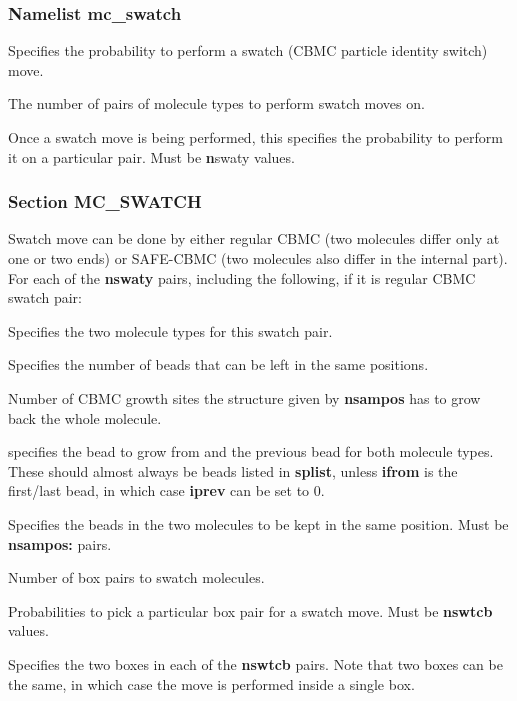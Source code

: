 \documentclass[12pt,letterpaper]{article}
\begin{document}
\subsubsection{Namelist \textbf{mc\_swatch}}
 Specifies the probability to perform
a swatch (CBMC particle identity switch) move.

 The number of pairs of molecule types
to perform swatch moves on.

 Once a swatch move is being
performed, this specifies the probability to perform it on a
particular pair. Must be {\textbf nswaty} values.

\subsubsection{Section \textbf{MC\_SWATCH}}
Swatch move can be done by either regular CBMC (two molecules differ only at one or two ends) or SAFE-CBMC (two molecules also differ in the internal part). For each of the \textbf{nswaty} pairs, including the following, if it is regular CBMC swatch pair:

 Specifies the two molecule types for this swatch pair.

 Specifies the number of beads that
can be left in the same positions.

 Number of CBMC growth sites the
structure given by {\bf nsampos} has to grow back the whole
molecule.

 specifies the bead
to grow from and the previous bead for both molecule types.
These should almost always be beads listed in {\bf splist},
unless {\bf ifrom} is the first/last bead, in which case
{\bf iprev} can be set to 0.

 Specifies the beads in the two
molecules to be kept in the same position. Must be {\bf
  nsampos:} pairs.

 Number of box pairs to swatch molecules.

 Probabilities to pick a particular
box pair for a swatch move. Must be {\bf nswtcb} values.

 Specifies the two boxes in each
of the {\bf nswtcb} pairs. Note that two boxes can be the
same, in which case the move is performed inside a single
box. \\
\end{document}
